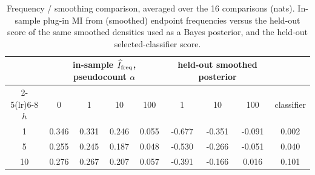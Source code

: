 \begin{table}[htbp]
\centering
\small
\caption{Frequency / smoothing comparison, averaged over the 16 comparisons (nats). In-sample plug-in MI from (smoothed) endpoint frequencies versus the held-out score of the same smoothed densities used as a Bayes posterior, and the held-out selected-classifier score.}\label{tab:frequency}
\begin{tabular}{c cccc ccc c}
\toprule
& \multicolumn{4}{c}{in-sample $\widehat I_{\rm freq}$, pseudocount $\alpha$} & \multicolumn{3}{c}{held-out smoothed posterior} & \\ \cmidrule(lr){2-5}\cmidrule(lr){6-8}
$h$ & 0 & 1 & 10 & 100 & 1 & 10 & 100 & classifier \\
\midrule
1 & 0.346 & 0.331 & 0.246 & 0.055 & -0.677 & -0.351 & -0.091 & 0.002 \\
5 & 0.255 & 0.245 & 0.187 & 0.048 & -0.530 & -0.266 & -0.051 & 0.040 \\
10 & 0.276 & 0.267 & 0.207 & 0.057 & -0.391 & -0.166 & 0.016 & 0.101 \\
\bottomrule
\end{tabular}
\end{table}